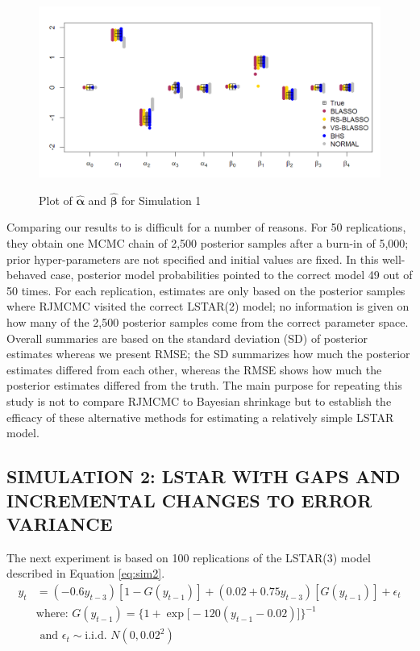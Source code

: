 \begin{figure}[!h]
	\centering
	      \caption{Plot of $\hat{\bm{\alpha}}$ and $\hat{\bm{\beta}}$ for Simulation 1 }
      \includegraphics[scale=0.35]{blassovsbhs}
      \label{fig:blvsbh}
\end{figure}

Comparing our results to \cite{Lopes2006} is difficult for a number of reasons. For 50 replications, they obtain one MCMC chain of 2,500 posterior samples after a burn-in of 5,000; prior hyper-parameters are not specified and initial values are fixed. In this well-behaved case, posterior model probabilities pointed to the correct model 49 out of 50 times. For each replication, estimates are only based on the posterior samples where RJMCMC visited the correct LSTAR(2) model; no information is given on how many of the 2,500 posterior samples come from the correct parameter space. Overall summaries are based on the standard deviation (SD) of posterior estimates whereas we present RMSE; the SD summarizes how much the posterior estimates differed from each other, whereas the RMSE shows how much the posterior estimates differed from the truth. The main purpose for repeating this study is not to compare RJMCMC to Bayesian shrinkage but to establish the efficacy of these alternative methods for estimating a relatively simple LSTAR model. 

\subsection{SIMULATION 2: LSTAR WITH GAPS AND INCREMENTAL CHANGES TO ERROR VARIANCE}

The next experiment is based on 100 replications of the LSTAR(3) model described in Equation \ref{eq:sim2}.
 \begin{equation}
	\begin{split}
		\label{eq:sim2}
		y_t&=(-0.6y_{t-3})[1-G(y_{t-1})] +(0.02+0.75y_{t-3})[G(y_{t-1})]+\epsilon_t\\
		& \textrm{where: } G(y_{t-1})=\bigg\{1+\exp\big[-120(y_{t-1}-0.02)\big]\bigg\}^{-1} \\
		&\textrm{ and }\epsilon_t \sim \textrm{i.i.d. }  N (0,0.02^2)\\
	\end{split}
\end{equation}

